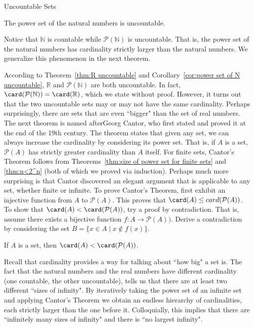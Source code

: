 \begin{section}{Uncountable Sets}
\begin{corollary}\label{cor:power set of N uncountable}
The power set of the natural numbers is uncountable.
\end{corollary}

Notice that $\mathbb{N}$ is countable while $\mathcal{P}(\mathbb{N})$ is uncountable.  That is, the power set of the natural numbers has cardinality strictly larger than the natural numbers. We generalize this phenomenon in the next theorem.

According to Theorem~\ref{thm:R uncountable} and Corollary~\ref{cor:power set of N uncountable}, $\mathbb{R}$ and $\mathcal{P}(\mathbb{N})$ are both uncountable. In fact, $\card(\mathcal{P}(\mathbb{N}))=\card(\mathbb{R})$, which we state without proof.  However, it turns out that the two uncountable sets may or may not have the same cardinality.  Perhaps surprisingly, there are sets that are even ``bigger" than the set of real numbers. The next theorem is named afterGeorg Cantor, who first stated and proved it at the end of the 19th century. The theorem states that given any set, we can always increase the cardinality by considering its power set. That is, if $A$ is a set, $\mathcal{P}(A)$ has strictly greater cardinality than $A$ itself. For finite sets, Cantor's Theorem follows from Theorems~\ref{thm:size of power set for finite sets} and \ref{thm:n<2^n} (both of which we proved via induction). Perhaps much more surprising is that Cantor discovered an elegant argument that is applicable to any set, whether finite or infinite. To prove Cantor's Theorem, first exhibit an injective function from $A$ to $\mathcal{P}(A)$. This proves that $\card(A)\leq card(\mathcal{P}(A))$. To show that $\card(A)< \card(\mathcal{P}(A))$, try a proof by contradiction. That is, assume there exists a bijective function $f:A\to\mathcal{P}(A))$. Derive a contradiction by considering the set $B=\{x\in A\mid x\notin f(x)\}$.

\begin{theorem}\label{thm:Cantors Theorem}
If $A$ is a set, then $\card(A)<\card(\mathcal{P}(A))$.
\end{theorem}

Recall that cardinality provides a way for talking about ``how big" a set is. The fact that the natural numbers and the real numbers have different cardinality (one countable, the other uncountable), tells us that there are at least two different ``sizes of infinity".  By iteratively taking the power set of an infinite set and applying Cantor's Theorem we obtain an endless hierarchy of cardinalities, each strictly larger than the one before it. Colloquially, this implies that there are ``infinitely many sizes of infinity" and there is ``no largest infinity".


\end{section}
